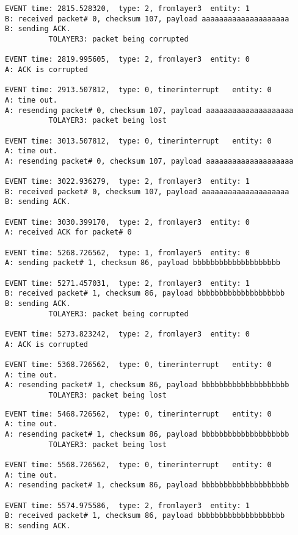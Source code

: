 \documentclass[12pt]{article}
\begin{document}
\begin{verbatim}
EVENT time: 2815.528320,  type: 2, fromlayer3  entity: 1
B: received packet# 0, checksum 107, payload aaaaaaaaaaaaaaaaaaaa
B: sending ACK.
          TOLAYER3: packet being corrupted

EVENT time: 2819.995605,  type: 2, fromlayer3  entity: 0
A: ACK is corrupted

EVENT time: 2913.507812,  type: 0, timerinterrupt   entity: 0
A: time out. 
A: resending packet# 0, checksum 107, payload aaaaaaaaaaaaaaaaaaaa
          TOLAYER3: packet being lost

EVENT time: 3013.507812,  type: 0, timerinterrupt   entity: 0
A: time out. 
A: resending packet# 0, checksum 107, payload aaaaaaaaaaaaaaaaaaaa

EVENT time: 3022.936279,  type: 2, fromlayer3  entity: 1
B: received packet# 0, checksum 107, payload aaaaaaaaaaaaaaaaaaaa
B: sending ACK.

EVENT time: 3030.399170,  type: 2, fromlayer3  entity: 0
A: received ACK for packet# 0

EVENT time: 5268.726562,  type: 1, fromlayer5  entity: 0
A: sending packet# 1, checksum 86, payload bbbbbbbbbbbbbbbbbbbb

EVENT time: 5271.457031,  type: 2, fromlayer3  entity: 1
B: received packet# 1, checksum 86, payload bbbbbbbbbbbbbbbbbbbb
B: sending ACK.
          TOLAYER3: packet being corrupted

EVENT time: 5273.823242,  type: 2, fromlayer3  entity: 0
A: ACK is corrupted

EVENT time: 5368.726562,  type: 0, timerinterrupt   entity: 0
A: time out. 
A: resending packet# 1, checksum 86, payload bbbbbbbbbbbbbbbbbbbb
          TOLAYER3: packet being lost
\end{verbatim}
\begin{Verbatim}[frame=single, rulecolor=\color{blue}, label=Handle Loss] 
EVENT time: 5468.726562,  type: 0, timerinterrupt   entity: 0
A: time out. 
A: resending packet# 1, checksum 86, payload bbbbbbbbbbbbbbbbbbbb
          TOLAYER3: packet being lost

EVENT time: 5568.726562,  type: 0, timerinterrupt   entity: 0
A: time out. 
A: resending packet# 1, checksum 86, payload bbbbbbbbbbbbbbbbbbbb

EVENT time: 5574.975586,  type: 2, fromlayer3  entity: 1
B: received packet# 1, checksum 86, payload bbbbbbbbbbbbbbbbbbbb
B: sending ACK.
\end{Verbatim}
\end{document}
